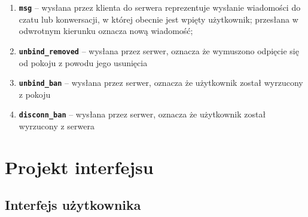 \begin{enumerate}
	\item \textbf{\texttt{msg}} -- wysłana przez klienta do serwera reprezentuje
	wysłanie wiadomości do czatu lub konwersacji, w której obecnie jest wpięty użytkownik;
	przesłana w odwrotnym kierunku oznacza nową wiadomość;

	\item \textbf{\texttt{unbind\_removed}} -- wysłana przez serwer, oznacza że
	wymuszono odpięcie się od pokoju z powodu jego usunięcia

	\item \textbf{\texttt{unbind\_ban}} -- wysłana przez serwer, oznacza że użytkownik
	został wyrzucony z pokoju

	\item \textbf{\texttt{disconn\_ban}} -- wysłana przez serwer, oznacza że
	użytkownik został wyrzucony z serwera
\end{enumerate}

\section{Projekt interfejsu}

\subsection{Interfejs użytkownika}
